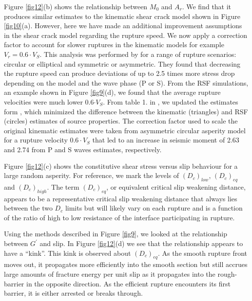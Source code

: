 \documentclass[preprint,1p, 10pt,authoryear]{elsarticle}
\begin{document}
Figure \ref{fig12}(b) shows the relationship between $M_{0}$ and $A_{r}$. We find that it produces similar estimates to the kinematic shear crack model shown in Figure \ref{fig10}(a). However, here we have made an additional improvement assumptions in the shear crack model regarding the rupture speed.  We now apply a correction factor to account for slower ruptures in the kinematic models for example $V_{r} = 0.6\cdot V_{S}$.  This analysis was performed by \citet{Kaneko2015} for a range of rupture scenarios: circular or elliptical and symmetric or asymmetric.  They found that decreasing the rupture speed can produce deviations of up to 2.5 times more stress drop depending on the model and the wave phase (P or S).  From the RSF simulations, an example shown in Figure \ref{fig9}(d), we found that the average rupture velocities were much lower 0.6$\cdot V_{S}$.  From table 1. in \citet{Kaneko2015}, we updated the estimates form \citet{Selvadurai2019}, which minimized the difference between the kinematic (triangles) and RSF (circles) estimates of source properties.  The correction factor used to scale the original kinematic estimates were taken from asymmetric circular asperity model for a rupture velocity $0.6\cdot V_{S}$ that led to an increase in seismic moment of 2.63 and 2.74 from P and S waves estimates, respectively.

Figure \ref{fig12}(c) shows the constitutive shear stress versus slip behaviour for a large random asperity. For reference, we mark the levels of $(D_{c})_{low}$, $(D_{c})_{eq}$ and $(D_{c})_{high}$.  The term $(D_{c})_{eq}$, or equivalent critical slip weakening distance, appears to be a representative critical slip weakening distance that always lies between the two $D_{c}$ limits but will likely vary on each rupture and is a function of the ratio of high to low resistance of the interface participating in rupture.

Using the methods described in Figure \ref{fig9}, we looked at the relationship between $G^{'}$ and slip. In Figure \ref{fig12}(d) we see that the relationship appears to have a ``kink''.  This kink is observed about $(D_{c})_{eq}$. As the smooth rupture front moves out, it propagates more efficiently into the smooth section but still accrues large amounts of fracture energy per unit slip as it propagates into the rough-barrier in the opposite direction. As the efficient rupture encounters its first barrier, it is either arrested or breaks through. 
\end{document}
